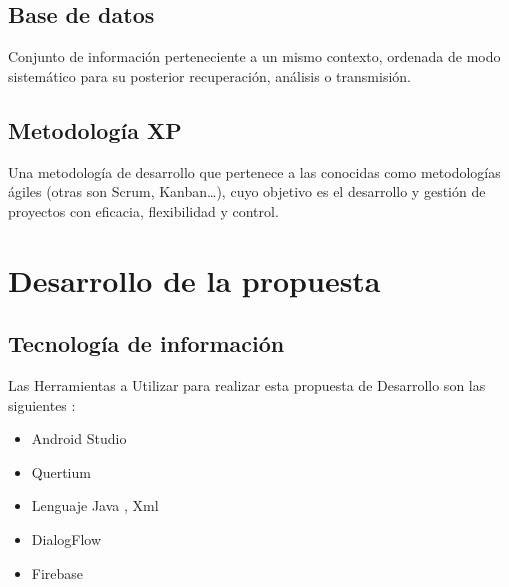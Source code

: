 \documentclass[preprint,12pt]{elsarticle}
\begin{document}
\subsection{Base de datos}
Conjunto de información perteneciente a un mismo contexto, ordenada de modo sistemático para su posterior recuperación, análisis o transmisión.
\subsection{Metodología XP}
Una metodología de desarrollo que pertenece a las conocidas como metodologías ágiles (otras son Scrum, Kanban…), cuyo objetivo es el desarrollo y gestión de proyectos con eficacia, flexibilidad y control.


\section{Desarrollo de la propuesta}
	\subsection{Tecnología de información }	
		Las Herramientas a Utilizar para realizar esta propuesta de Desarrollo son las siguientes :
		
	\begin{itemize}
   	 \item Android Studio 
    	\item Quertium 
    	\item Lenguaje Java , Xml
    	\item DialogFlow
	\item Firebase
	\end{itemize}
\end{document}
